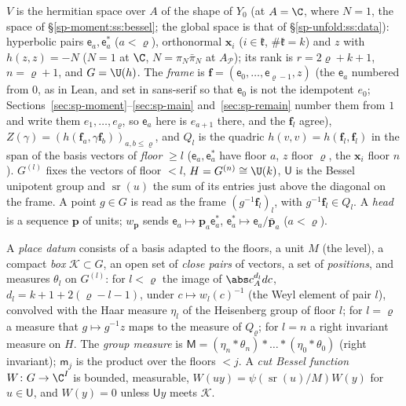 $V$ is the hermitian space over $A$ of the shape of $Y_0$ (at $A=\C$, where $N=1$, the space of
\S\ref{sp-moment:ss:bessel}; the global space is that of \S\ref{sp-unfold:ss:data}): hyperbolic pairs $\mathsf e_a,\mathsf e_a^*$
($a<\varrho$), orthonormal $\mathbf x_i$ ($i\in\mathfrak k$, $\#\mathfrak k=k$) and $z$ with $h(z,z)=-N$ ($N=1$ at $\C$,
$N=\pi_N\bar\pi_N$ at $A_{\mathcal P}$); its rank is $r=2\varrho+k+1$, $n=\varrho+1$, and $G=\U(h)$. The
\emph{frame} is $\mathbf f=(\mathsf e_0,\dots,\mathsf e_{\varrho-1},z)$ (the $\mathsf e_a$ numbered from $0$, as in
Lean, and set in sans-serif so that $\mathsf e_0$ is not the idempotent $e_0$;
Sections~\ref{sec:sp-moment}--\ref{sec:sp-main} and~\ref{sec:sp-remain} number them from $1$ and write
them $e_1,\dots,e_\varrho$, so $\mathsf e_a$ here is $e_{a+1}$ there, and the $\mathbf f_l$ agree), $Z(\gamma)=(h(\mathbf f_a,\gamma\mathbf f_b))_{a,b\le\varrho}$, and
$Q_l$ is the quadric $h(v,v)=h(\mathbf f_l,\mathbf f_l)$ in the span of the basis vectors of \emph{floor} $\ge l$
($\mathsf e_a,\mathsf e_a^*$ have floor $a$, $z$ floor $\varrho$, the $\mathbf x_i$ floor $n$). $G^{(l)}$ fixes the vectors
of floor $<l$, $H=G^{(n)}\cong\U(k)$, $\mathsf U$ is the Bessel unipotent group and $\operatorname{sr}(u)$ the
sum of its entries just above the diagonal on the frame. A point $g\in G$ is read as the frame
$(g^{-1}\mathbf f_l)_l$, with $g^{-1}\mathbf f_l\in Q_l$. A \emph{head} is a sequence $\mathbf p$ of units; $w_{\mathbf p}$ sends
$\mathsf e_a\mapsto\mathbf p_a\mathsf e_a^*$, $\mathsf e_a^*\mapsto\mathsf e_a/\bar{\mathbf p}_a$ ($a<\varrho$).

\begin{definition}\label{sp-frames:def:datum}
A \emph{place datum} consists of a basis adapted to the floors, a unit $M$ (the level), a compact
\emph{box} $\mathcal K\subset G$, an open set of \emph{close pairs} of vectors, a set of
\emph{positions}, and measures $\theta_l$ on $G^{(l)}$: for $l<\varrho$ the image of
$\abs c_A^{d_l}dc$, $d_l=k+1+2(\varrho-l-1)$, under $c\mapsto w_l(c)^{-1}$ (the Weyl element of pair
$l$), convolved with the Haar measure $\eta_l$ of the Heisenberg group of floor $l$; for $l=\varrho$
a measure that $g\mapsto g^{-1}z$ maps to the measure of $Q_\varrho$; for $l=n$ a right invariant
measure on $H$. The \emph{group measure} is
$\mathsf M=(\eta_n*\theta_n)*\dots*(\eta_0*\theta_0)$ (right invariant); $\mathsf m_j$ is the
product over the floors $<j$. A \emph{cut Bessel function} $W\colon G\to\C^I$ is bounded,
measurable, $W(uy)=\psi(\operatorname{sr}(u)/M)W(y)$ for $u\in\mathsf U$, and $W(y)=0$ unless $\mathsf Uy$
meets $\mathcal K$.
\end{definition}

